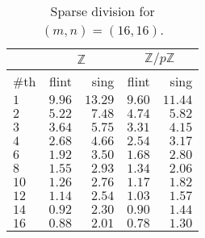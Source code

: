 \documentclass{deliverablereport}
\begin{document}
\begin{table}
\begin{tabular}{l | r | r | r | r | }
 & \multicolumn{2}{|c|}{$\mathbb{Z}$} & \multicolumn{2}{|c|}{$\mathbb{Z}/p \mathbb{Z}$} \\ \hline
\#th   & flint & sing & flint & sing\\ \hline
$1$   & $9.96$ & $13.29$ &$9.60$ & $11.44$\\ \hline
$2$   & $5.22$ & $7.48$ &$4.74$ & $5.82$\\ \hline
$3$   & $3.64$ & $5.75$  &$3.31$ & $4.15$\\ \hline
$4$   & $2.68$ & $4.66$  &$2.54$ & $3.17$\\ \hline
$6$   & $1.92$ & $3.50$  &$1.68$ & $2.80$\\ \hline
$8$   & $1.55$ & $2.93$  &$1.34$ & $2.06$\\ \hline
$10$  & $1.26$ & $2.76$  &$1.17$ & $1.82$\\ \hline
$12$  & $1.14$ & $2.54$  &$1.03$ & $1.57$\\ \hline
$14$  & $0.92$ & $2.30$  &$0.90$ & $1.44$\\ \hline
$16$  & $0.88$ & $2.01$  &$0.78$ & $1.30$\\ \hline
\end{tabular}
\caption{Sparse division for $(m, n) = (16, 16)$.}
\label{table_sparse_div}
\end{table}
\end{document}
